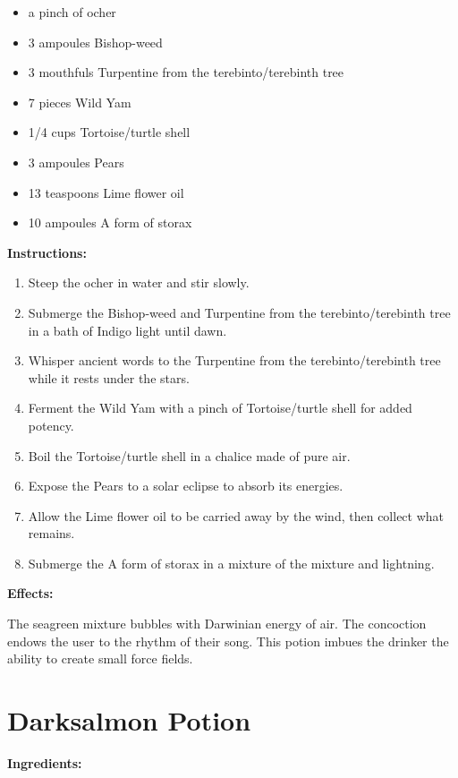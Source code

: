 \documentclass{article}
\begin{document}
\begin{itemize}
  \item a pinch of ocher
  \item 3 ampoules Bishop-weed
  \item 3 mouthfuls Turpentine from the terebinto/terebinth tree
  \item 7 pieces Wild Yam
  \item 1/4 cups Tortoise/turtle  shell
  \item 3 ampoules Pears
  \item 13 teaspoons Lime flower oil
  \item 10 ampoules A form of storax
\end{itemize}

\textbf{Instructions:}

\begin{enumerate}
  \item Steep the ocher in water and stir slowly.
  \item Submerge the Bishop-weed and Turpentine from the terebinto/terebinth tree in a bath of Indigo light until dawn.
  \item Whisper ancient words to the Turpentine from the terebinto/terebinth tree while it rests under the stars.
  \item Ferment the Wild Yam with a pinch of Tortoise/turtle  shell for added potency.
  \item Boil the Tortoise/turtle  shell in a chalice made of pure air.
  \item Expose the Pears to a solar eclipse to absorb its energies.
  \item Allow the Lime flower oil to be carried away by the wind, then collect what remains.
  \item Submerge the A form of storax in a mixture of the mixture and lightning.
\end{enumerate}

\textbf{Effects:}

The seagreen mixture bubbles with Darwinian energy of air. The concoction endows the user to the rhythm of their song. This potion imbues the drinker the ability to create small force fields.

\newpage
\section*{Darksalmon Potion}

\textbf{Ingredients:}
\end{document}
